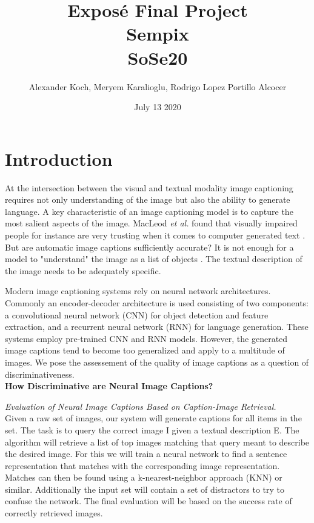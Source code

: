\documentclass[12pt]{article}
\title{Exposé Final Project \\ \small{Sempix} \\ \small{SoSe20}}
\author{Alexander Koch, Meryem Karalioglu, Rodrigo Lopez Portillo Alcocer}
\date{July 13 2020}
\begin{document}
\maketitle	



\section{Introduction}

At the intersection between the visual and textual modality image captioning requires not only understanding of the image but also the ability to generate language.
A key characteristic of an image captioning model is to capture the most salient aspects of the image.
MacLeod \textit{et al.} found that visually impaired people for instance are very trusting when it comes to computer generated text \cite{blind}.
But are automatic image captions sufficiently accurate?
It is not enough for a model to "understand" the image as a list of objects \cite{bernardi2016automatic}.
The textual description of the image needs to be adequately specific.

Modern image captioning systems rely on neural network architectures. 
Commonly an encoder-decoder architecture is used consisting of two components: a convolutional neural network (CNN) for object detection and feature extraction, and a recurrent neural network (RNN) for language generation. These systems employ pre-trained CNN and RNN models. 
However, the generated image captions tend to become too generalized and apply to a multitude of images.
We pose the assessement of the quality of image captions as a question of discriminativeness.\\



\textbf{How Discriminative are Neural Image Captions?}

\textit{Evaluation of Neural Image Captions Based on Caption-Image Retrieval.}\\


Given a raw set of images, our system will generate captions for all items in the set. The task is to query the correct image I given a textual description E. 
The algorithm will retrieve a list of top images matching that query meant to describe the desired image. 
For this we will train a neural network to find a sentence representation that matches with the corresponding image representation. 
Matches can then be found using a k-nearest-neighbor approach (KNN) or similar. Additionally the input set will contain a set of distractors to try to confuse the network. 
The final evaluation will be based on the success rate of correctly retrieved images.
\end{document}
